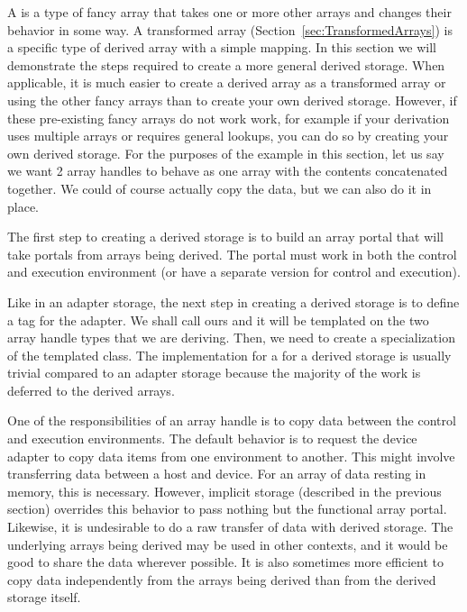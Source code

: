A  is a type of fancy array that takes one or more
other arrays and changes their behavior in some way. A transformed array
(Section~\ref{sec:TransformedArrays}) is a specific type of derived array
with a simple mapping. In this section we will demonstrate the steps
required to create a more general derived storage. When applicable, it is
much easier to create a derived array as a transformed array or using the
other fancy arrays than to create your own derived storage. However, if
these pre-existing fancy arrays do not work work, for example if your
derivation uses multiple arrays or requires general lookups, you can do so
by creating your own derived storage. For the purposes of the example in
this section, let us say we want 2 array handles to behave as one array
with the contents concatenated together. We could of course actually copy
the data, but we can also do it in place.

The first step to creating a derived storage is to build an array portal
that will take portals from arrays being derived. The portal must work in
both the control and execution environment (or have a separate version for
control and execution).


Like in an adapter storage, the next step in creating a derived storage
is to define a tag for the adapter. We shall call ours
 and it will be templated on
the two array handle types that we are deriving. Then, we need to create a
specialization of the templated 
class. The implementation for a  for
a derived storage is usually trivial compared to an adapter storage
because the majority of the work is deferred to the derived arrays.


One of the responsibilities of an array handle is to copy data between the
control and execution environments. The default behavior is to request the
device adapter to copy data items from one environment to another. This
might involve transferring data between a host and device. For an array of
data resting in memory, this is necessary. However, implicit storage
(described in the previous section) overrides this behavior to pass nothing
but the functional array portal. Likewise, it is undesirable to do a raw
transfer of data with derived storage. The underlying arrays being
derived may be used in other contexts, and it would be good to share the
data wherever possible. It is also sometimes more efficient to copy data
independently from the arrays being derived than from the derived storage
itself.

